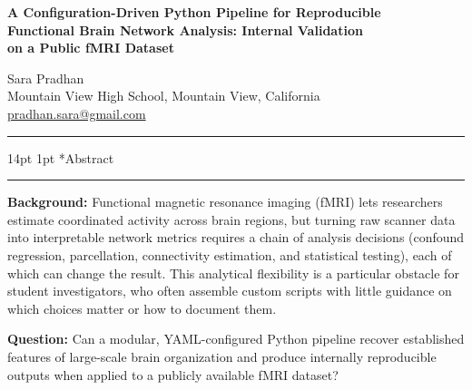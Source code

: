 \documentclass[12pt]{article}
\makeatletter
\renewcommand\section{%
  \@startsection{section}{1}{\z@}%
    {14pt \@plus 4pt \@minus 2pt}%
    {1pt}%
    {\normalfont\large\bfseries\color{black}}}
\makeatother
\begin{document}
\begin{center}
  {\large\bfseries
    A Configuration-Driven Python Pipeline for Reproducible\\
    Functional Brain Network Analysis: Internal Validation\\
    on a Public fMRI Dataset}

  \vspace{10pt}
  {\normalsize Sara Pradhan}\\[2pt]
  {\small Mountain View High School, Mountain View, California}\\
  {\small \href{mailto:pradhan.sara@gmail.com}{pradhan.sara@gmail.com}}
\end{center}

\vspace{6pt}
\rule{\linewidth}{0.6pt}

\section*{Abstract}
\noindent\rule{\linewidth}{0.4pt}\vspace{2pt}

\noindent\textbf{Background:}
Functional magnetic resonance imaging (fMRI) lets researchers estimate
coordinated activity across brain regions, but turning raw scanner data
into interpretable network metrics requires a chain of analysis
decisions (confound regression, parcellation, connectivity estimation,
and statistical testing), each of which can change the result. This
analytical flexibility is a particular obstacle for student
investigators, who often assemble custom scripts with little guidance on
which choices matter or how to document them.

\noindent\textbf{Question:}
Can a modular, YAML-configured Python pipeline recover established
features of large-scale brain organization and produce internally
reproducible outputs when applied to a publicly available fMRI dataset?
\end{document}
